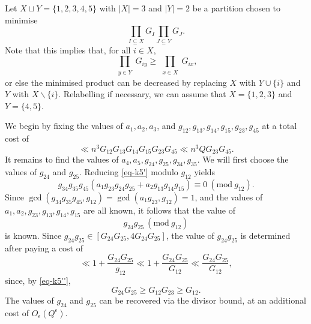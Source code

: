 \documentclass[11pt,letterpaper]{amsart}
\newcommand{\abs}[1]{\left\lvert #1\right\rvert}
\newcommand{\brac}[1]{\left( #1\right)}
\newcommand{\Mod}[1]{\ (\mathrm{mod}\ #1)}
\newcommand{\ogcd}[2]{\gcd(#1,#2)}
\theoremstyle{definition}
\begin{document}
Let $X\sqcup Y=\{1,2,3,4,5\}$ with $\abs{X}=3$ and $\abs{Y}=2$ be a partition chosen to minimise 
\[\prod_{I\subseteq X}G_I\prod_{J\subseteq Y}G_J.\]
Note that this implies that, for all $i\in X$,
\begin{equation}\label{eq-k5''}
\prod_{\substack{y \in Y}}G_{iy}\geq \prod_{\substack{x \in X}}G_{ix},
\end{equation}
or else the minimised product can be decreased by replacing $X$ with $Y\cup \{i\}$ and $Y$ with $X\backslash \{i\}$. Relabelling if necessary, we can assume that $X=\{1,2,3\}$ and $Y=\{4,5\}$. 

We begin by fixing the values of $a_1,a_2,a_3$, and $g_{12},g_{13},g_{14},g_{15},g_{23},g_{45}$ at a total cost of 
\[\ll n^3G_{12}G_{13}G_{14}G_{15}G_{23}G_{45}\ll n^3QG_{23}G_{45}.\]
It remains to find the values of $a_4,a_5,g_{24},g_{25},g_{34},g_{35}$. We will first choose the values of $g_{24}$ and $g_{25}$. Reducing \eqref{eq-k5'} modulo $g_{12}$ yields
\[g_{34}g_{35}g_{45}\brac{a_1g_{23}g_{24}g_{25}+a_2g_{13}g_{14}g_{15}}\equiv 0\Mod{g_{12}}.\]
Since $\ogcd{g_{34}g_{35}g_{45}}{g_{12}}=\ogcd{a_1g_{23}}{g_{12}}=1$, and the values of $a_1,a_2,g_{23},g_{13},g_{14},g_{15}$ are all known, it follows that the value of
\[g_{24}g_{25}\Mod{g_{12}}\]
is known. Since $g_{24}g_{25}\in [G_{24}G_{25},4G_{24}G_{25}]$, the value of $g_{24}g_{25}$ is determined after paying a cost of
\[\ll 1+ \frac{G_{24}G_{25}}{g_{12}}\ll 1+\frac{G_{24}G_{25}}{G_{12}}\ll \frac{G_{24}G_{25}}{G_{12}},\]
since, by \eqref{eq-k5''},
\[G_{24}G_{25}\geq G_{12}G_{23}\geq G_{12}.\]
The values of $g_{24}$ and $g_{25}$ can be recovered via the divisor bound, at an additional cost of $O_\epsilon(Q^\epsilon)$. 
\end{document}
